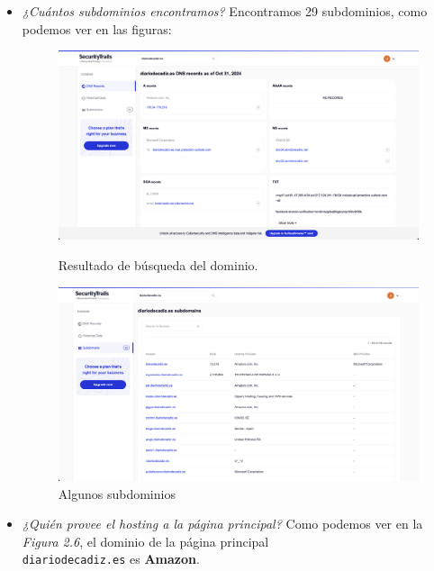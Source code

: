 \documentclass[12pt]{book}
\begin{document}
\begin{itemize}
    \item \textit{¿Cuántos subdominios encontramos?}
    \newline
    Encontramos 29 subdominios, como podemos ver en las figuras:
    \begin{figure}[h]
    \begin{minipage}{0.5\textwidth}
        \centering
        \includegraphics[width=.8\linewidth]{Practica 3y4/images/Screenshot 2024-10-31 at 09.50.15.png}
        \caption{Resultado de búsqueda del dominio.}
        \label{fig:enter-label}
    \end{minipage}
    \hfill
    \begin{minipage}{0.5\textwidth}
        \centering
        \includegraphics[width=.8\linewidth]{Practica 3y4/images/Screenshot 2024-10-31 at 09.51.30.png}
        \caption{Algunos subdominios}
        \label{fig:enter-label}
    \end{minipage}
    \end{figure}

    \item \textit{¿Quién provee el hosting a la página principal?}
    \newline
    Como podemos ver en la \textit{Figura 2.6}, el dominio de la página principal\\ \texttt{diariodecadiz.es} es \textbf{Amazon}.
    \newpage
    

\end{itemize}
\end{document}
